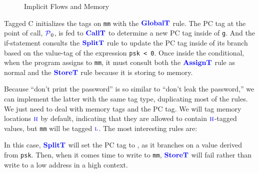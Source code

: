 \documentclass{llncs}
\begin{document}
\begin{figure}
\caption{Implicit Flows and Memory}
\label{fig:ex2}
\end{figure}

Tagged C initializes the tags on {\tt mm} with the \(\color{blue} \mathbf{GlobalT}\) rule. The PC tag
at the point of call, \(\mathcal{\color{blue} P}_0\), is fed to \(\color{blue} \mathbf{CallT}\) to determine a new PC tag
inside of {\tt g}. And the if-statement consults the \(\color{blue} \mathbf{SplitT}\) rule to update the PC tag
inside of its branch based on the value-tag of the expression {\tt psk < 0}. Once inside the
conditional, when the program assigns to {\tt mm}, it must consult both the
\(\color{blue} \mathbf{AssignT}\) rule as normal and the \(\color{blue} \mathbf{StoreT}\) rule because it is storing
to memory.

Because ``don't print the password'' is so similar to ``don't leak the password,'' we can
implement the latter with the same tag type, duplicating most of the rules. We just need to
deal with memory tags and the PC tag. We will tag memory
locations \(\textnormal{\color{blue} \sc h}\) by default, indicating that they are allowed to contain \(\textnormal{\color{blue} \sc h}\)-tagged values,
but {\tt mm} will be tagged \(\textnormal{\color{blue} \sc l}\). The most interesting rules are:

\begin{figure}
\end{figure}

In this case, \(\color{blue} \mathbf{SplitT}\) will set the PC tag to \high, as it branches on a value derived from {\tt psk}.
Then, when it comes time to write to {\tt mm}, \(\color{blue} \mathbf{StoreT}\) will fail rather than write to a low address
in a high context.
\end{document}
